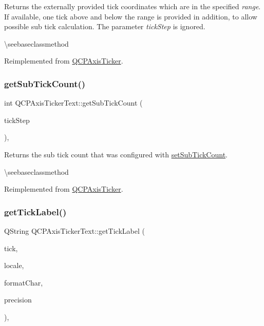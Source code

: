 Returns the externally provided tick coordinates which are in the specified {\itshape range}. If available, one tick above and below the range is provided in addition, to allow possible sub tick calculation. The parameter {\itshape tick\+Step} is ignored.

\textbackslash{}seebaseclassmethod 

Reimplemented from \mbox{\hyperlink{class_q_c_p_axis_ticker_af4645a824c7bd2ca8fc7e86ebf9055bd}{Q\+C\+P\+Axis\+Ticker}}.

\mbox{\label{class_q_c_p_axis_ticker_text_a9c2488b877776870239abda4c8106052}} 
\subsubsection{\texorpdfstring{getSubTickCount()}{getSubTickCount()}}
{\footnotesize\ttfamily int Q\+C\+P\+Axis\+Ticker\+Text\+::get\+Sub\+Tick\+Count (\begin{DoxyParamCaption}\item[{double}]{tick\+Step }\end{DoxyParamCaption})\hspace{0.3cm}{\ttfamily [protected]}, {\ttfamily [virtual]}}

Returns the sub tick count that was configured with \mbox{\hyperlink{class_q_c_p_axis_ticker_text_a8cfa50c51183c90186892eeef978d571}{set\+Sub\+Tick\+Count}}.

\textbackslash{}seebaseclassmethod 

Reimplemented from \mbox{\hyperlink{class_q_c_p_axis_ticker_a4ccc403ced7a1457ce6ba293509933c8}{Q\+C\+P\+Axis\+Ticker}}.

\mbox{\label{class_q_c_p_axis_ticker_text_a99247779a9c20bea1f50911117540a71}} 
\subsubsection{\texorpdfstring{getTickLabel()}{getTickLabel()}}
{\footnotesize\ttfamily Q\+String Q\+C\+P\+Axis\+Ticker\+Text\+::get\+Tick\+Label (\begin{DoxyParamCaption}\item[{double}]{tick,  }\item[{const Q\+Locale \&}]{locale,  }\item[{Q\+Char}]{format\+Char,  }\item[{int}]{precision }\end{DoxyParamCaption})\hspace{0.3cm}{\ttfamily [protected]}, {\ttfamily [virtual]}}

